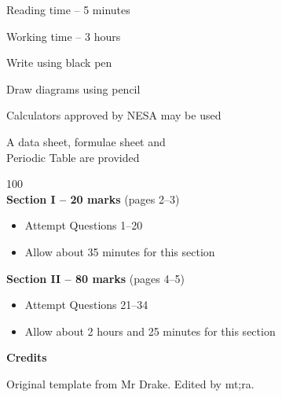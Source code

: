 \begin{coverpage}{}
    

    \vspace{1cm}

    
    \vspace{1cm}    %
    

    \begin{multicols}{2}
    \begin{minipage}[t]{16cm}
    \begin{generalinstructions}                        
        \item Reading time -- 5 minutes
        \item Working time -- 3 hours
        \item Write using black pen
        \item Draw diagrams using pencil
        \item Calculators approved by NESA may be used
        \item A data sheet, formulae sheet and \\ Periodic Table are provided
    \end{generalinstructions}
    \end{minipage}
    
    \vspace{1cm}    %
    
    \columnbreak
    \begin{minipage}[t]{16cm}
    \begin{sectionlist}{100}
    \\
        \textbf{Section I -- 20 marks} (pages 2--3)   
        \begin{itemize}     %
            \item Attempt Questions 1--20
            \item Allow about 35 minutes for this section
        \end{itemize}
        \textbf{Section II -- 80 marks} (pages 4--5)   
        \begin{itemize}     %
            \item Attempt Questions 21--34
            \item Allow about 2 hours and 25 minutes for this section
        \end{itemize}
    \end{sectionlist}
\end{minipage}
\end{multicols}

\textbf{Credits}

Original template from Mr Drake. Edited by mt;ra.

\end{coverpage}